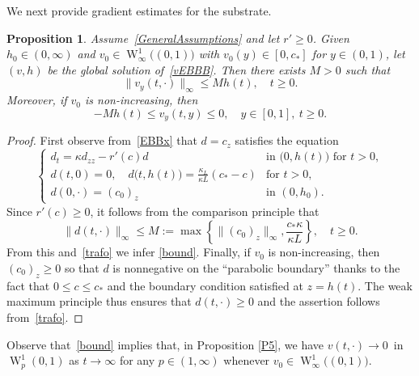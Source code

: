 \documentclass[reqno,11pt]{amsart}
\newtheorem{prop}[thm]{Proposition}
\numberwithin{equation}{section}
\begin{document}
We next provide gradient estimates for the substrate.


\begin{prop}\label{P6}
Assume~\eqref{GeneralAssumptions} and let $r'\ge 0$. Given  $h_0\in
(0,\infty)$ and \mbox{$v_0\in \operatorname{W}_\infty^1\bigl(
(0,1)\bigr)$} with \mbox{$v_0(y)\in [0,c_*]$} for $y\in (0,1)$, let
$(v,h)$ be the global solution of~\eqref{vEBBB}. Then there exists 
$M>0$ such that 
\begin{equation}\label{bound}
\| v_y(t,\cdot)\|_{\infty}\leq M h(t), \quad t\geq 0.
\end{equation}
Moreover, if
$v_0$ is non-increasing, then
$$
- M h(t)\le v_y(t,y)\le 0, \quad y\in [0,1],\ t\geq 0.
$$
\end{prop}

\begin{proof}
First observe from~\eqref{EBBx} that $d=c_z$ satisfies the equation
$$\begin{cases}
  d_t=\kappa d_{zz}-r'(c)d&\text{in }\bigl( 0,h(t)\bigr)\text{ for } t>0,\\
  d(t,0)=0,\quad d\bigl( t,h(t)\bigr)=\frac{\kappa _L}{\kappa L}(c_*-c)&
  \text{for }t>0,\\d(0,\cdot)=(c_0)_z&\text{in }(0,h_0).\end{cases}
$$
Since $r'(c)\ge 0$, it follows from the comparison principle that
$$
\| d(t,\cdot)\|_\infty\leq M:=\max\left\{ \| (c_0)_z\|_\infty, \frac{c_*\kappa}{\kappa
  L}\right\}, \quad t\geq 0.
$$
From this and~\eqref{trafo} we infer \eqref{bound}. Finally, if
$v_0$ is non-increasing, then $(c_0)_z\ge 0$ so that $d$ is
nonnegative on the ``parabolic boundary'' thanks to the fact that
$0\leq c\leq c_*$ and the boundary condition satisfied at
$z=h(t)$. The weak maximum principle thus ensures that $d(t,\cdot)\geq
0$ and the assertion follows from~\eqref{trafo}.
\end{proof}

Observe that~\eqref{bound} implies that, in Proposition \ref{P5}, we
have  \mbox{$v(t,\cdot)\to 0$ in $\operatorname{W}^1_p(0,1)$} as
$t\to\infty$ for any $p\in (1,\infty)$ whenever $v_0\in
\operatorname{W}_\infty^1\bigl( (0,1)\bigr)$.
\end{document}
